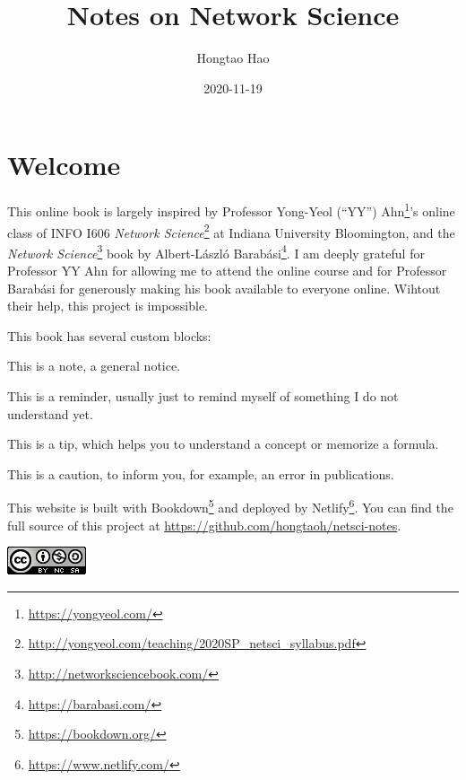 \documentclass[
]{krantz}
\title{Notes on Network Science}
\author{Hongtao Hao}
\date{2020-11-19}
\makeatletter
\renewcommand{\href}[2]{#2\footnote{\url{#1}}}
\newenvironment{kframe}{%
\medskip{}
\setlength{\fboxsep}{.8em}
 \def\at@end@of@kframe{}%
 \ifinner\ifhmode%
  \def\at@end@of@kframe{\end{minipage}}%
  \begin{minipage}{\columnwidth}%
 \fi\fi%
 \def\FrameCommand##1{\hskip\@totalleftmargin \hskip-\fboxsep
 \colorbox{shadecolor}{##1}\hskip-\fboxsep
     \hskip-\linewidth \hskip-\@totalleftmargin \hskip\columnwidth}%
 \MakeFramed {\advance\hsize-\width
   \@totalleftmargin\z@ \linewidth\hsize
   \@setminipage}}%
 {\par\unskip\endMakeFramed%
 \at@end@of@kframe}
\newenvironment{rmdblock}[1]
  {
  \begin{itemize}
  \renewcommand{\labelitemi}{
    \raisebox{-.7\height}[0pt][0pt]{
      {\setkeys{Gin}{width=3em,keepaspectratio}\texttt{[image: images/\#1]}}
    }
  }
  \setlength{\fboxsep}{1em}
  \begin{kframe}
  \item
  }
  {
  \end{kframe}
  \end{itemize}
  }
\newenvironment{rmdnote}
  {\begin{rmdblock}{note}}
  {\end{rmdblock}}
\newenvironment{rmdcaution}
  {\begin{rmdblock}{caution}}
  {\end{rmdblock}}
\newenvironment{rmdtip}
  {\begin{rmdblock}{tip}}
  {\end{rmdblock}}
\newenvironment{rmdreminder}
  {\begin{rmdblock}{reminder}}
  {\end{rmdblock}}
\makeatother
\begin{document}
\maketitle

{
\hypersetup{linkcolor=}
\setcounter{tocdepth}{2}
\tableofcontents
}
\listoftables
\listoffigures
\hypertarget{welcome}{%
\chapter*{Welcome}\label{welcome}}


This online book is largely inspired by Professor \href{https://yongyeol.com/}{Yong-Yeol (``YY'') Ahn}'s online class of \href{http://yongyeol.com/teaching/2020SP_netsci_syllabus.pdf}{INFO I606 \emph{Network Science}} at Indiana University Bloomington, and the \href{http://networksciencebook.com/}{\emph{Network Science}} book by \href{https://barabasi.com/}{Albert-László Barabási}. I am deeply grateful for Professor YY Ahn for allowing me to attend the online course and for Professor Barabási for generously making his book available to everyone online. Wihtout their help, this project is impossible.

This book has several custom blocks:

\begin{rmdnote}
This is a note, a general notice.
\end{rmdnote}

\begin{rmdreminder}
This is a reminder, usually just to remind myself of something I do not understand yet.
\end{rmdreminder}

\begin{rmdtip}
This is a tip, which helps you to understand a concept or memorize a formula.
\end{rmdtip}

\begin{rmdcaution}
This is a caution, to inform you, for example, an error in publications.
\end{rmdcaution}

This website is built with \href{https://bookdown.org/}{Bookdown} and deployed by \href{https://www.netlify.com/}{Netlify}. You can find the full source of this project at \url{https://github.com/hongtaoh/netsci-notes}.

\includegraphics{images/license.png}
\end{document}
